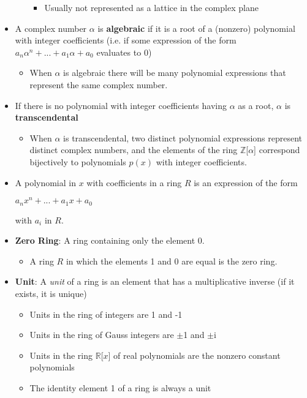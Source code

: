 \documentclass[12pt]{article}
\begin{document}
\begin{itemize}
\begin{itemize}
\begin{itemize}
      \item Usually not represented as a lattice in the complex plane
    \end{itemize}
  \end{itemize}
  \item A complex number $\alpha$ is \textbf{algebraic} if it is a root of a (nonzero) polynomial with integer coefficients (i.e. if some expression of the form $a_n\alpha^n + ... + a_1\alpha + a_0$ evaluates to 0)
  \begin{itemize}
    \item When $\alpha$ is algebraic there will be many polynomial expressions that represent the same complex number.
  \end{itemize}
  \item If there is no polynomial with integer coefficients having $\alpha$ as a root, $\alpha$ is \textbf{transcendental}
  \begin{itemize}
    \item When $\alpha$ is transcendental, two distinct polynomial expressions represent distinct complex numbers, and the elements of the ring $\mathbb{Z}$[$\alpha$] correspond bijectively to polynomials $p(x)$ with integer coefficients.
  \end{itemize}
  \item A polynomial in $x$ with coefficients in a ring $R$ is an expression of the form
  \begin{center}
    $a_nx^n + ... + a_1x + a_0$
  \end{center}
  with $a_i$ in $R$.
  \item \textbf{Zero Ring}: A ring containing only  the element 0.
  \begin{itemize}
    \item A ring $R$ in which the elements 1 and 0 are equal is the zero ring.
  \end{itemize}
  \item \textbf{Unit}: A \textit{unit} of a ring is an element that has a multiplicative inverse (if it exists, it is unique)
  \begin{itemize}
    \item Units in the ring of integers are 1 and -1
    \item Units in the ring of Gauss integers are $\pm$1 and $\pm$i
    \item Units in the ring $\mathbb{R}$[$x$] of real polynomials are the nonzero constant polynomials
    \item The identity element 1 of a ring is always a unit
  \end{itemize}
\end{itemize}
\end{document}

